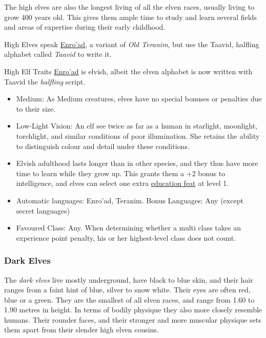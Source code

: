 The high elves are also the longest living of all the elven races, usually
living to grow 400 years old. This gives them ample time to study and learn
several fields and areas of expertise during their early childhood.

High Elves speak \hyperref[sec:Speak Language]{Enro'ad}, a variant of
\emph{Old Teranim}, but use the Taavid, halfling alphabet called \emph{Taavid}
to write it.

\begin{35e}{High Elf Traits}
  \hyperref[sec:Speak Language]{Enro'ad} is elvish, albeit the elven alphabet
  is now written with Taavid the \emph{halfling} script.

  \begin{itemize}[noitemsep]
    \item Medium: As Medium creatures, elves have no special bonuses or
    penalties due to their size.
    \item Low-Light Vision: An elf see twice as far as a human in starlight,
    moonlight, torchlight, and similar conditions of poor illumination. She
    retains the ability to distinguish colour and detail under these
    conditions.
    \item Elvish adulthood lasts longer than in other species, and they thus
      have more time to learn while they grow up. This grants them a +2 bonus
      to intelligence, and elves can select one extra
      \hyperref[sec:Education Feats]{education feat} at level 1.
    \item Automatic languages: Enro'ad, Teranim. Bonus Languages: Any (except
      secret languages)
    \item Favoured Class: Any. When determining whether a multi class takes an
    experience point penalty, his or her highest-level class does not count.
  \end{itemize}
\end{35e}

\subsubsection{Dark Elves}
\label{sec:Dark Elves}

The \emph{dark elves} live mostly underground, have black to blue skin, and
their hair ranges from a faint hint of blue, silver to snow white. Their eyes
are often red, blue or a green. They are the smallest of all elven races, and
range from 1.60 to 1.90 metres in height. In terms of bodily physique they
also more closely resemble humans. Their rounder faces, and their stronger and
more muscular physique sets them apart from their slender high elven cousins.

